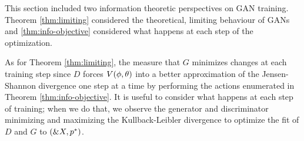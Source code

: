
This section included two information theoretic perspectives on GAN
training. Theorem \ref{thm:limiting} considered the theoretical,
limiting behaviour of GANs and \ref{thm:info-objective} considered what
happens at each step of the optimization.

As for Theorem \ref{thm:limiting}, the measure that $G$ minimizes
changes at each training step since $D$ forces $V(\phi, \theta)$ into a better
approximation of the Jensen-Shannon divergence one step at a time by
performing the actions enumerated in Theorem \ref{thm:info-objective}.
It is useful to consider what happens at each step of training; when
we do that, we observe the generator and discriminator minimizing and
maximizing the Kullback-Leibler divergence to optimize the fit of $D$
and $G$ to $(\&X, p^*)$.


